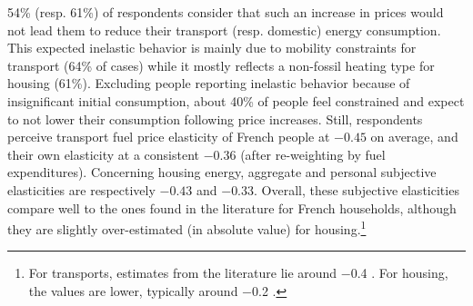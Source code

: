 \documentclass[english,5p,authoryear]{elsarticle}
\begin{document}
54\% (resp. 61\%) of respondents consider that such an increase in prices would not lead them to reduce their transport (resp. domestic) energy consumption. This expected inelastic behavior is mainly due to mobility constraints for transport (64\% of cases) while it mostly reflects a non-fossil heating type for housing (61\%). Excluding people reporting inelastic behavior because of insignificant initial consumption, about 40\% of people feel constrained and expect to not lower their consumption following price increases. Still, respondents perceive transport fuel price elasticity of French people at $-0.45$ on average, and their own elasticity at a consistent $-0.36$ (after re-weighting by fuel expenditures). Concerning housing energy, aggregate and personal subjective elasticities are respectively $-0.43$ and $-0.33$. Overall, these subjective elasticities compare well to the ones found in the literature for French households, although they are slightly over-estimated (in absolute value) for housing.\footnote{For transports, estimates from the literature lie around $-$0.4 \citep{clerc_marcus,bureau_distributional_2011,douenne_vertical_2018}. For housing, the values are lower, typically around $-$0.2 \citep{douenne_vertical_2018,clerc_marcus}.}


\end{document}
